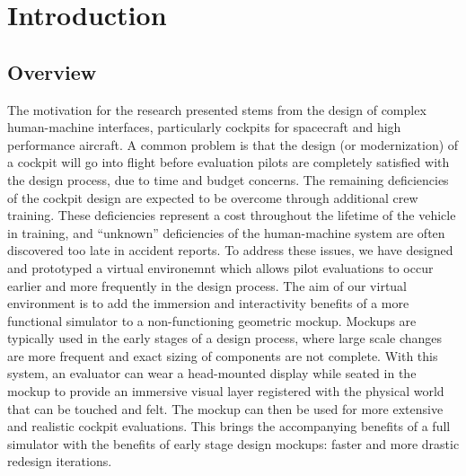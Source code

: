 \chapter{Introduction}

\section{Overview}
\label{overview}

The motivation for the research presented stems from the design of complex human-machine interfaces, particularly cockpits for spacecraft and high performance aircraft.
A common problem is that the design (or modernization) of a cockpit will go into flight before evaluation pilots are completely satisfied with the design process, due to time and budget concerns.
The remaining deficiencies of the cockpit design are expected to be overcome through additional crew training.
These deficiencies represent a cost throughout the lifetime of the vehicle in training, and ``unknown'' deficiencies of the human-machine system are often discovered too late in accident reports.
To address these issues, we have designed and prototyped a virtual environemnt which allows pilot evaluations to occur earlier and more frequently in the design process.
The aim of our virtual environment is to add the immersion and interactivity benefits of a more functional simulator to a non-functioning geometric mockup.
Mockups are typically used in the early stages of a design process, where large scale changes are more frequent and exact sizing of components are not complete.
With this system, an evaluator can wear a head-mounted display while seated in the mockup to provide an immersive visual layer registered with the physical world that can be touched and felt.
The mockup can then be used for more extensive and realistic cockpit evaluations.
This brings the accompanying benefits of a full simulator with the benefits of early stage design mockups: faster and more drastic redesign iterations.


